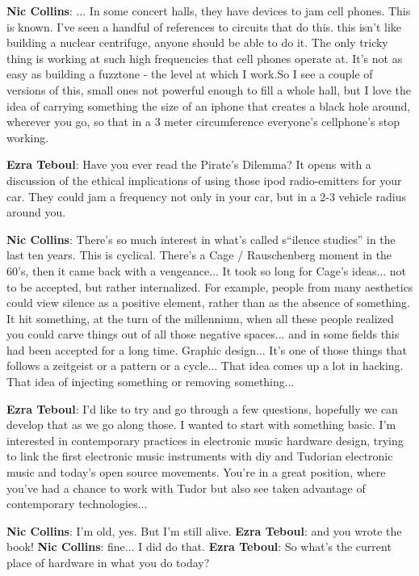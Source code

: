 \textbf{Nic Collins}: ... In some concert halls, they have devices to jam cell phones. This is known. I’ve seen a handful of references to circuits that do this. this isn’t like building a nuclear centrifuge, anyone should be able to do it. The only tricky thing is working at such high frequencies that cell phones operate at. It’s not as easy as building a fuzztone - the level at which I work.So I see a couple of versions of this, small ones not powerful enough to fill a whole hall, but I love the idea of carrying something the size of an iphone that creates a black hole around, wherever you go, so that in a 3 meter circumference everyone’s cellphone’s stop working.		
					
\textbf{Ezra Teboul}: Have you ever read the Pirate’s Dilemma? It opens with a discussion of the ethical implications of using those ipod radio-emitters for your car. They could jam a frequency not only in your car, but in a 2-3 vehicle radius around you.
					
\textbf{Nic Collins}: There’s so much interest in what’s called s``ilence studies'' in the last ten years. This is cyclical. There’s a Cage / Rauschenberg moment in the 60’s, then it came back with a vengeance... It took so long for Cage’s ideas... not to be accepted, but rather internalized. For example, people from many aesthetics could view silence as a positive element, rather than as the absence of something. It hit something, at the turn of the millennium, when all these people realized you could carve things out of all those negative spaces... and in some fields this had been accepted for a long time. Graphic design... It’s one of those things that follows a zeitgeist or a pattern or a cycle... That idea comes up a lot in hacking. That idea of injecting something or removing something...
					
\textbf{Ezra Teboul}: I’d like to try and go through a few questions, hopefully we can develop that as we go along those. I wanted to start with something basic. I’m interested in contemporary practices in electronic music hardware design, trying to link the first electronic music instruments with diy and Tudorian electronic music and today’s open source movements. You’re in a great position, where you’ve had a chance to work with Tudor but also see taken advantage of contemporary technologies...
					
\textbf{Nic Collins}: I’m old, yes. But I’m still alive.
\textbf{Ezra Teboul}: and you wrote the book!
\textbf{Nic Collins}: fine... I did do that.
\textbf{Ezra Teboul}: So what’s the current place of hardware in what you do today?
					
